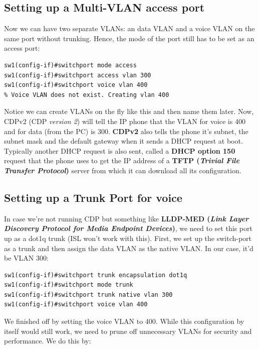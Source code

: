 \subsection{Setting up a Multi-VLAN access port}
Now we can have two separate VLANs: an data VLAN and a voice VLAN on the same port without trunking. Hence, the mode of the port still has to be set as an access port: 

\vspace{-15pt}
\begin{verbatim}
sw1(config-if)#switchport mode access
sw1(config-if)#switchport access vlan 300
sw1(config-if)#switchport voice vlan 400
% Voice VLAN does not exist. Creating vlan 400
\end{verbatim}
\vspace{-10pt}

\noindent
Notice we can create VLANs on the fly like this and then name them later. Now, CDPv2 (CDP \textit{version 2}) will tell the IP phone that the VLAN for voice is 400 and for data (from the PC) is 300. \textbf{CDPv2} also tells the phone it's subnet, the subnet mask and the default gateway when it sends a DHCP request at boot. Typically another DHCP request is also sent, called a \textbf{DHCP option 150} request that the phone uses to get the IP address of a \textbf{TFTP (\textit{Trivial File Transfer Protocol})} server from which it can download all its configuration. 

\subsection{Setting up a Trunk Port for voice}
In case we're not running CDP but something like \textbf{LLDP-MED (\textit{Link Layer Discovery Protocol for Media Endpoint Devices})}, we need to set this port up as a dot1q trunk (ISL won't work with this). First, we set up the switch-port as a trunk and then assign the data VLAN as the native VLAN. In our case, it'd be VLAN 300: 

\vspace{-15pt}
\begin{verbatim}
sw1(config-if)#switchport trunk encapsulation dot1q
sw1(config-if)#switchport mode trunk
sw1(config-if)#switchport trunk native vlan 300
sw1(config-if)#switchport voice vlan 400
\end{verbatim}
\vspace{-10pt}

\noindent
We finished off by setting the voice VLAN to 400. While this configuration by itself would still work, we need to prune off unnecessary VLANs for security and performance. We do this by:

